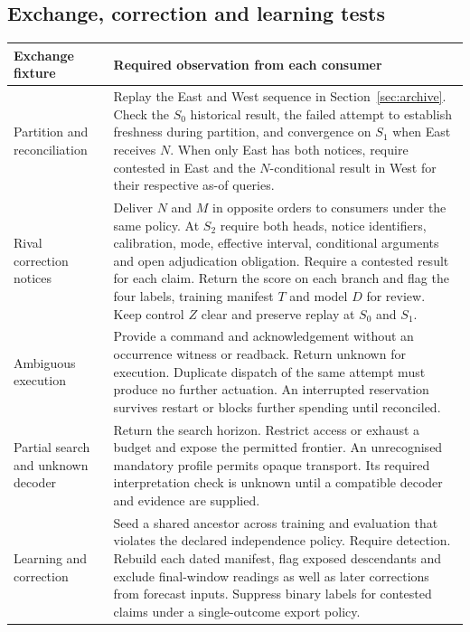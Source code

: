 \documentclass[11pt,a4paper]{article}
\begin{document}
\clearpage
{}
\subsection*{Exchange, correction and learning tests}
\small
\begin{tabularx}{\linewidth}{@{}L{.23\linewidth}Y@{}}
\toprule
\textbf{Exchange fixture} & \textbf{Required observation from each consumer} \\ \midrule
Partition and reconciliation & Replay the East and West sequence in Section~\ref{sec:archive}. Check the $S_0$ historical result, the failed attempt to establish freshness during partition, and convergence on $S_1$ when East receives $N$. When only East has both notices, require contested in East and the $N$-conditional result in West for their respective as-of queries. \\
Rival correction notices & Deliver $N$ and $M$ in opposite orders to consumers under the same policy. At $S_2$ require both heads, notice identifiers, calibration, mode, effective interval, conditional arguments and open adjudication obligation. Require a contested result for each claim. Return the score on each branch and flag the four labels, training manifest $T$ and model $D$ for review. Keep control $Z$ clear and preserve replay at $S_0$ and $S_1$. \\
Ambiguous execution & Provide a command and acknowledgement without an occurrence witness or readback. Return unknown for execution. Duplicate dispatch of the same attempt must produce no further actuation. An interrupted reservation survives restart or blocks further spending until reconciled. \\
Partial search and unknown decoder & Return the search horizon. Restrict access or exhaust a budget and expose the permitted frontier. An unrecognised mandatory profile permits opaque transport. Its required interpretation check is unknown until a compatible decoder and evidence are supplied. \\
Learning and correction & Seed a shared ancestor across training and evaluation that violates the declared independence policy. Require detection. Rebuild each dated manifest, flag exposed descendants and exclude final-window readings as well as later corrections from forecast inputs. Suppress binary labels for contested claims under a single-outcome export policy. \\
\bottomrule
\end{tabularx}
\normalsize
\end{document}
